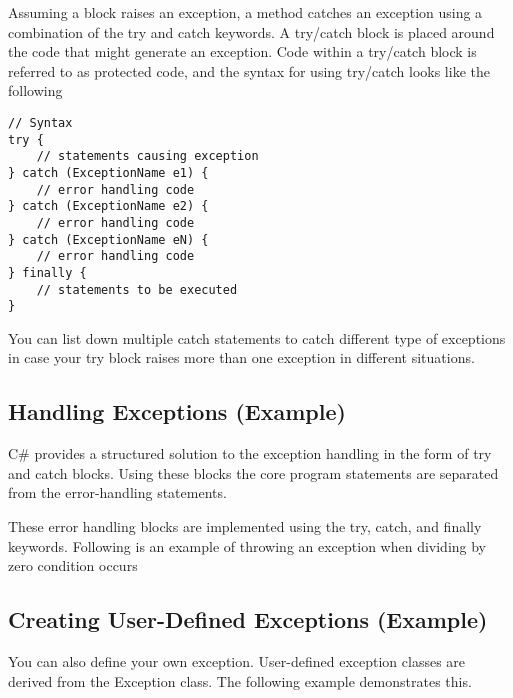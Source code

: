 Assuming a block raises an exception, a method catches an exception using a combination of the try
and catch keywords. A try/catch block is placed around the code that might generate an exception.
Code within a try/catch block is referred to as protected code, and the syntax for using try/catch
looks like the following

\begin{lstlisting}[numbers=none]
// Syntax	
try {
	// statements causing exception
} catch (ExceptionName e1) {
	// error handling code
} catch (ExceptionName e2) {
	// error handling code
} catch (ExceptionName eN) {
	// error handling code
} finally {
	// statements to be executed
}
\end{lstlisting}

You can list down multiple catch statements to catch different type of exceptions in case your try
block raises more than one exception in different situations.

\subsection*{Handling Exceptions (Example)}
C\# provides a structured solution to the exception handling in the form of try and catch blocks.
Using these blocks the core program statements are separated from the error-handling statements.

These error handling blocks are implemented using the try, catch, and finally keywords. Following
is an example of throwing an exception when dividing by zero condition occurs





\subsection*{Creating User-Defined Exceptions (Example)}
You can also define your own exception. User-defined exception classes are derived from the
Exception class. The following example demonstrates this.





